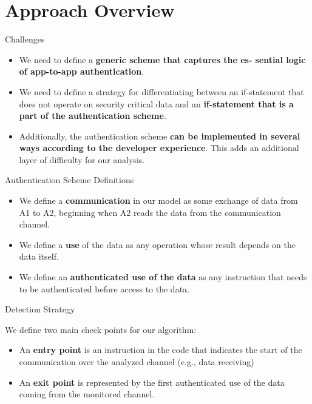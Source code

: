 \documentclass[10pt]{beamer}
\begin{document}
\section{Approach Overview}
\begin{frame}[fragile]{Challenges}

  \begin{itemize}

  \item We need to define a {\bf generic scheme that captures the es-
      sential logic of app-to-app authentication}.

  \item We need to define a strategy for differentiating between an
    if-statement that does not operate on security critical data and
    an {\bf if-statement that is a part of the authentication scheme}.

  \item Additionally, the authentication scheme {\bf can be
      implemented in several ways according to the developer
      experience}. This adds an additional layer of difficulty for our
      analysis.

  \end{itemize}
  
\end{frame}

\begin{frame}[fragile]{Authentication Scheme Definitions}

  \begin{itemize}

  \item We define a {\bf communication} in our model as some exchange
    of data from A1 to A2, beginning when A2 reads the data from the
    communication channel.

  \item We define a {\bf use} of the data as any operation whose
    result depends on the data itself.

  \item We define an {\bf authenticated use of the data} as any
    instruction that needs to be authenticated before access to the
    data.
      
  \end{itemize}

  
\end{frame}

\begin{frame}[fragile]{Detection Strategy}

  We define two main check points for our algorithm:
  \begin{itemize}

  \item An {\bf entry point} is an instruction in the code that
      indicates the start of the communication over the analyzed
      channel (e.g., data receiving)

    \item An {\bf exit point} is represented by the first
      authenticated use of the data coming from the monitored channel.

   \end{itemize}
  
\end{frame}
\end{document}
